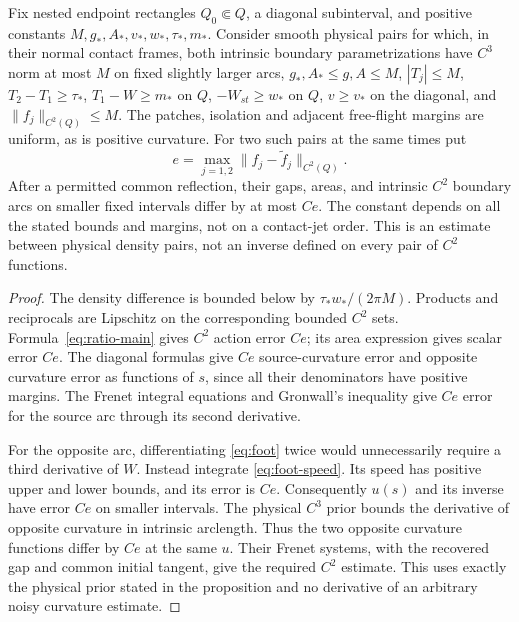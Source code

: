 \begin{proposition}\label{prop:local-stable}
Fix nested endpoint rectangles $Q_0\Subset Q$, a diagonal subinterval,
and positive constants $M,g_*,A_*,v_*,w_*,\tau_*,m_*$. Consider smooth
physical pairs for which, in their normal contact frames, both intrinsic
boundary parametrizations have $C^3$ norm at most $M$ on fixed slightly
larger arcs, $g_*,A_*\le g,A\le M$, $|T_j|\le M$,
$T_2-T_1\ge\tau_*$, $T_1-W\ge m_*$ on $Q$,
$-W_{st}\ge w_*$ on $Q$, $v\ge v_*$ on the diagonal, and
$\|f_j\|_{C^2(Q)}\le M$. The patches, isolation and adjacent free-flight
margins are uniform, as is positive curvature. For two such pairs at
the same times put
\[
        e=\max_{j=1,2}\|f_j-\widetilde f_j\|_{C^2(Q)}.
\]
After a permitted common reflection, their gaps, areas, and intrinsic
$C^2$ boundary arcs on smaller fixed intervals differ by at most $Ce$.
The constant depends on all the stated bounds and margins, not on a
contact-jet order. This is an estimate between physical density pairs,
not an inverse defined on every pair of $C^2$ functions.
\end{proposition}
\begin{proof}
The density difference is bounded below by
$\tau_*w_* /(2\pi M)$. Products and reciprocals are Lipschitz on the
corresponding bounded $C^2$ sets. Formula~\eqref{eq:ratio-main} gives
$C^2$ action error $Ce$; its area expression gives scalar error $Ce$.
The diagonal formulas give $Ce$ source-curvature error and opposite
curvature error as functions of $s$, since all their denominators have
positive margins. The Frenet integral equations and Gronwall's inequality
give $Ce$ error for the source arc through its second derivative.

For the opposite arc, differentiating \eqref{eq:foot} twice would
unnecessarily require a third derivative of $W$. Instead integrate
\eqref{eq:foot-speed}. Its speed has positive upper and lower bounds,
and its error is $Ce$. Consequently $u(s)$ and its inverse have error
$Ce$ on smaller intervals. The physical $C^3$ prior bounds the derivative
of opposite curvature in intrinsic arclength. Thus the two opposite
curvature functions differ by $Ce$ at the same $u$. Their Frenet systems,
with the recovered gap and common initial tangent, give the required
$C^2$ estimate. This uses exactly the physical prior stated in the
proposition and no derivative of an arbitrary noisy curvature estimate.
\end{proof}
